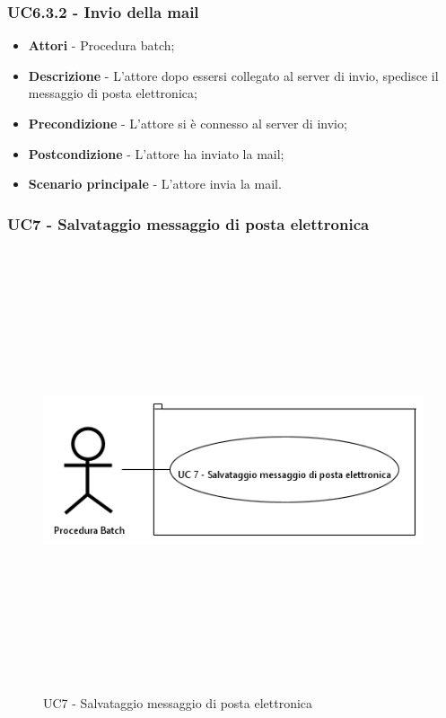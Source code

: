                    \subsubsection{UC6.3.2 - Invio della mail}

                        \begin{itemize}

                            \item \textbf{Attori} - Procedura batch;
                            \item \textbf{Descrizione} - L'attore dopo essersi collegato al server di invio, spedisce il
                            messaggio di posta elettronica;
                            \item \textbf{Precondizione} - L'attore si è connesso al server di invio;
                            \item \textbf{Postcondizione} - L'attore ha inviato la mail;
                            \item \textbf{Scenario principale} - L'attore invia la mail.

                        \end{itemize}

\newpage

            \subsubsection{UC7 - Salvataggio messaggio di posta elettronica}

				\begin{figure}[H]
    	            \centering
        	        \includegraphics[width=13cm,height=13cm,keepaspectratio]{./images/UC7.png}
            	    \caption{UC7 - Salvataggio messaggio di posta elettronica}
            	\end{figure}

